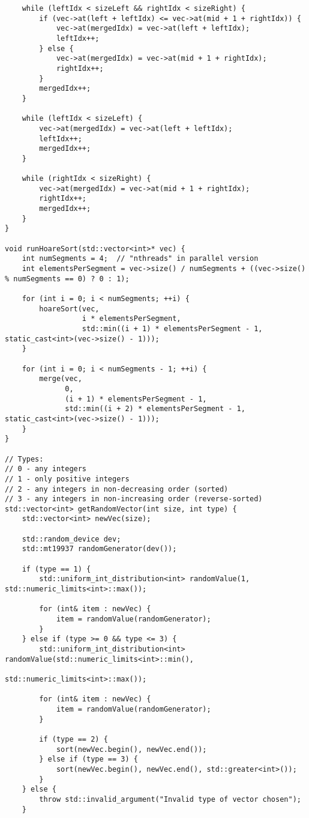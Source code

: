 \documentclass{report}
\begin{document}
\begin{lstlisting}
    while (leftIdx < sizeLeft && rightIdx < sizeRight) {
        if (vec->at(left + leftIdx) <= vec->at(mid + 1 + rightIdx)) {
            vec->at(mergedIdx) = vec->at(left + leftIdx);
            leftIdx++;
        } else {
            vec->at(mergedIdx) = vec->at(mid + 1 + rightIdx);
            rightIdx++;
        }
        mergedIdx++;
    }

    while (leftIdx < sizeLeft) {
        vec->at(mergedIdx) = vec->at(left + leftIdx);
        leftIdx++;
        mergedIdx++;
    }

    while (rightIdx < sizeRight) {
        vec->at(mergedIdx) = vec->at(mid + 1 + rightIdx);
        rightIdx++;
        mergedIdx++;
    }
}

void runHoareSort(std::vector<int>* vec) {
    int numSegments = 4;  // "nthreads" in parallel version
    int elementsPerSegment = vec->size() / numSegments + ((vec->size() % numSegments == 0) ? 0 : 1);

    for (int i = 0; i < numSegments; ++i) {
        hoareSort(vec,
                  i * elementsPerSegment,
                  std::min((i + 1) * elementsPerSegment - 1, static_cast<int>(vec->size() - 1)));
    }

    for (int i = 0; i < numSegments - 1; ++i) {
        merge(vec,
              0,
              (i + 1) * elementsPerSegment - 1,
              std::min((i + 2) * elementsPerSegment - 1, static_cast<int>(vec->size() - 1)));
    }
}

// Types:
// 0 - any integers
// 1 - only positive integers
// 2 - any integers in non-decreasing order (sorted)
// 3 - any integers in non-increasing order (reverse-sorted)
std::vector<int> getRandomVector(int size, int type) {
    std::vector<int> newVec(size);

    std::random_device dev;
    std::mt19937 randomGenerator(dev());

    if (type == 1) {
        std::uniform_int_distribution<int> randomValue(1, std::numeric_limits<int>::max());

        for (int& item : newVec) {
            item = randomValue(randomGenerator);
        }
    } else if (type >= 0 && type <= 3) {
        std::uniform_int_distribution<int> randomValue(std::numeric_limits<int>::min(),
                                                       std::numeric_limits<int>::max());

        for (int& item : newVec) {
            item = randomValue(randomGenerator);
        }

        if (type == 2) {
            sort(newVec.begin(), newVec.end());
        } else if (type == 3) {
            sort(newVec.begin(), newVec.end(), std::greater<int>());
        }
    } else {
        throw std::invalid_argument("Invalid type of vector chosen");
    }


\end{lstlisting}
\end{document}
